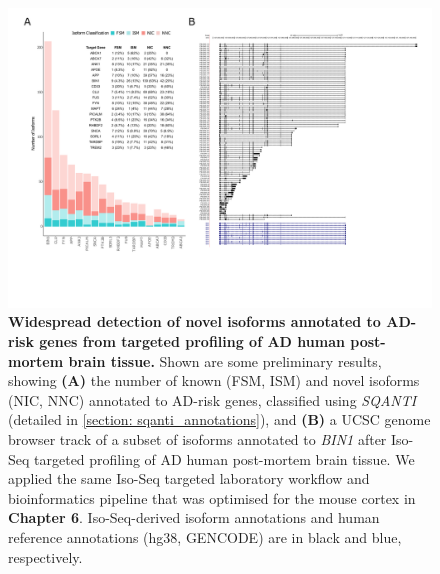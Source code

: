 \begin{landscape}
	\begin{figure}[!htp]
		\centering
		\includegraphics[page=1,trim={1.5cm 3.5cm 2cm 1cm}, scale = 0.85]{Figures/Bin1_ADBDR.pdf}
		\captionsetup{width=1.5\textwidth}
		\caption[Preliminary results from targeted profiling of human post-mortem brain tissue]%
		{\textbf{Widespread detection of novel isoforms annotated to AD-risk genes from targeted profiling of AD human post-mortem brain tissue.} Shown are some preliminary results, showing \textbf{(A)} the number of known (FSM, ISM) and novel isoforms (NIC, NNC) annotated to AD-risk genes, classified using \textit{SQANTI} (detailed in \cref{section: sqanti_annotations}), and \textbf{(B)} a UCSC genome browser track of a subset of isoforms annotated to \textit{BIN1} after Iso-Seq targeted profiling of AD human post-mortem brain tissue. We applied the same Iso-Seq targeted laboratory workflow and bioinformatics pipeline that was optimised for the mouse cortex in \textbf{Chapter 6}. Iso-Seq-derived isoform annotations and human reference annotations (hg38, GENCODE) are in black and blue, respectively.}   
		\label{fig:adbdr}
	\end{figure}	
\end{landscape}   

